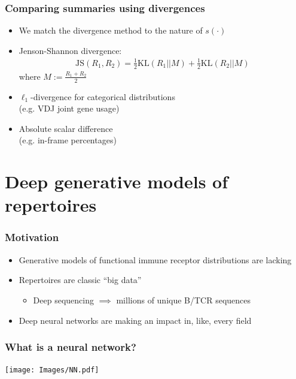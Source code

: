 \documentclass[mathserif,compress]{beamer}
\newcommand*\ba{\[ \begin{aligned}}
\newcommand*\ea{\end{aligned} \]}
\renewcommand\;{\,}
\begin{document}
\begin{frame}\frametitle{Comparing summaries using divergences}
\begin{itemize}
\item
We match the divergence method to the nature of $s(\cdot)$
\bigskip
\item
Jenson-Shannon divergence:
\ba
\text{JS}(R_1, R_2) = \frac{1}{2} \text{KL}(R_1 || M) + \frac{1}{2} \text{KL}(R_2 || M)
\ea
where $M := \frac{R_1 + R_2}{2}$

\bigskip
\item
$\ell_1$-divergence for categorical distributions
\\ \vspace{0.5em}
(e.g. VDJ joint gene usage)
\bigskip
\item
Absolute scalar difference \\
(e.g. in-frame percentages)
\end{itemize}
\end{frame}

\section{Deep generative models of repertoires}

\begin{frame}\frametitle{Motivation}
\begin{itemize}
\item
Generative models of functional immune receptor distributions are lacking
\bigskip
\item
Repertoires are classic ``big data'' 
\bigskip
\begin{itemize}
\item
Deep sequencing $\implies$ millions of unique B/TCR sequences
\end{itemize}
\bigskip
\item
Deep neural networks are making an impact in, like, every field
\end{itemize}
\end{frame}

\begin{frame}\frametitle{What is a neural network?}
\begin{center}
\texttt{[image: Images/NN.pdf]}
\end{center}
\end{frame}
\end{document}
